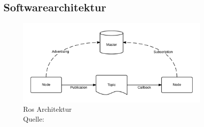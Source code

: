 
\subsection{Softwarearchitektur}
\begin{figure}[htb]
	\centering
	\includegraphics[width=0.85\textwidth]{images/stand_der_technik/ros-master-node-topic}
	\caption[Ros Architektur]{Ros Architektur \\Quelle: \cite{noauthor_ros-master-node-topicpng_nodate}}
	\label{fig:ros_master_node_topic}
\end{figure}
\FloatBarrier

